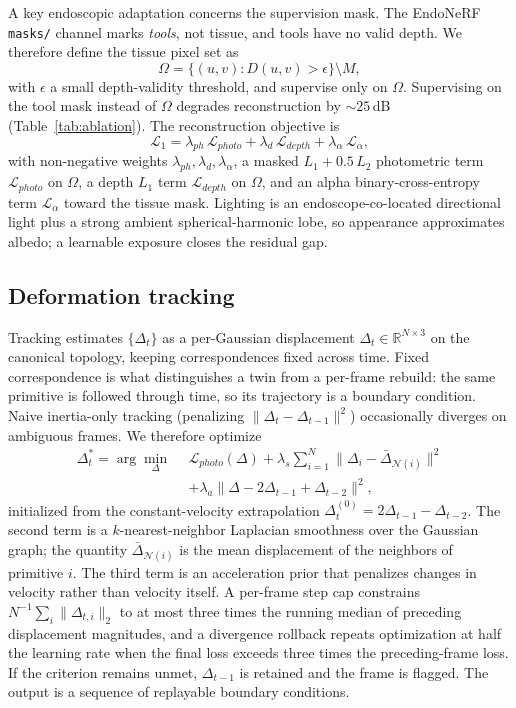 \documentclass[pdflatex,lineno,referee,sn-vancouver,Numbered]{sn-jnl}
\begin{document}
A key endoscopic adaptation concerns the supervision mask. The EndoNeRF
\texttt{masks/} channel marks \emph{tools}, not tissue, and tools have no
valid depth. We therefore define the tissue pixel set as
\begin{equation}
\Omega = \{(u,v) : D(u,v) > \epsilon \} \setminus M,
\label{eq:mask}
\end{equation}
with $\epsilon$ a small depth-validity threshold, and supervise only on
$\Omega$. Supervising on the tool mask instead of $\Omega$ degrades
reconstruction by ${\sim}25$\,dB (Table~\ref{tab:ablation}). The reconstruction
objective is
\begin{equation}
\mathcal{L}_1 = \lambda_{ph}\,\mathcal{L}_{photo} + \lambda_d\,\mathcal{L}_{depth} + \lambda_\alpha\,\mathcal{L}_{\alpha},
\label{eq:tier1loss}
\end{equation}
with non-negative weights $\lambda_{ph},\lambda_d,\lambda_\alpha$, a masked
$L_1 + 0.5\,L_2$ photometric term $\mathcal{L}_{photo}$ on $\Omega$, a
depth $L_1$ term $\mathcal{L}_{depth}$ on $\Omega$, and an alpha
binary-cross-entropy term
$\mathcal{L}_{\alpha}$ toward the tissue mask. Lighting is an
endoscope-co-located directional light plus a strong ambient
spherical-harmonic lobe, so appearance approximates albedo; a learnable
exposure closes the residual gap.

\subsection{Deformation tracking}
\label{sec:tier2}
Tracking estimates $\{\Delta_t\}$ as a per-Gaussian displacement
$\Delta_t \in \mathbb{R}^{N \times 3}$ on the canonical topology, keeping
correspondences fixed across time. Fixed correspondence is what
distinguishes a twin from a per-frame rebuild: the same primitive is
followed through time, so its trajectory is a boundary condition. Naive
inertia-only tracking (penalizing $\|\Delta_t - \Delta_{t-1}\|^2$)
occasionally diverges on ambiguous frames. We therefore optimize
\begin{align}
\Delta_t^* = \arg\min_{\Delta}\ \ & \mathcal{L}_{photo}(\Delta)
+ \lambda_s \sum_{i=1}^{N} \big\| \Delta_i - \bar{\Delta}_{\mathcal{N}(i)} \big\|^2 \nonumber\\
& + \lambda_a \big\| \Delta - 2\Delta_{t-1} + \Delta_{t-2} \big\|^2,
\label{eq:track}
\end{align}
initialized from the constant-velocity extrapolation
$\Delta_t^{(0)} = 2\Delta_{t-1} - \Delta_{t-2}$. The second term is a
$k$-nearest-neighbor Laplacian smoothness over the Gaussian graph; the
quantity $\bar{\Delta}_{\mathcal{N}(i)}$ is the mean displacement of the
neighbors of primitive $i$. The third term is an acceleration prior that
penalizes changes in velocity rather
than velocity itself. A per-frame step cap constrains
$N^{-1}\sum_i\|\Delta_{t,i}\|_2$ to at most three times the running median
of preceding displacement magnitudes, and
a divergence rollback repeats optimization at half the learning rate when
the final loss exceeds three times the preceding-frame loss. If the
criterion remains unmet, $\Delta_{t-1}$ is retained and the frame is
flagged. The output is a sequence of replayable boundary conditions.
\end{document}
